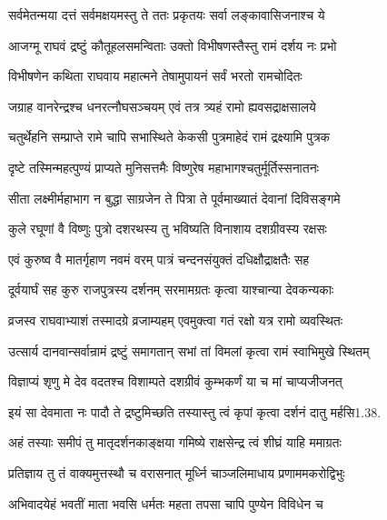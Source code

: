 \twolineshloka
{सर्वमेतन्मया दत्तं सर्वमक्षयमस्तु ते}
{ततः प्रकृतयः सर्वा लङ्कावासिजनाश्च ये}%

\twolineshloka
{आजग्मू राघवं द्रष्टुं कौतूहलसमन्विताः}
{उक्तो विभीषणस्तैस्तु रामं दर्शय नः प्रभो}%

\twolineshloka
{विभीषणेन कथिता राघवाय महात्मने}
{तेषामुपायनं सर्वं भरतो रामचोदितः}%

\twolineshloka
{जग्राह वानरेन्द्रश्च धनरत्नौघसञ्चयम्}
{एवं तत्र त्र्यहं रामो ह्यवसद्राक्षसालये}%

\twolineshloka
{चतुर्थेहनि सम्प्राप्ते रामे चापि सभास्थिते}
{केकसी पुत्रमाहेदं रामं द्रक्ष्यामि पुत्रक}%

\twolineshloka
{दृष्टे तस्मिन्महत्पुण्यं प्राप्यते मुनिसत्तमैः}
{विष्णुरेष महाभागश्चतुर्मूर्तिस्सनातनः}%

\twolineshloka
{सीता लक्ष्मीर्महाभाग न बुद्धा साग्रजेन ते}
{पित्रा ते पूर्वमाख्यातं देवानां दिविसङ्गमे}%

\twolineshloka
{कुले रघूणां वै विष्णुः पुत्रो दशरथस्य तु}
{भविष्यति विनाशाय दशग्रीवस्य रक्षसः}%


\twolineshloka
{एवं कुरुष्व वै मातर्गृहाण नवमं वरम्}
{पात्रं चन्दनसंयुक्तं दधिक्षौद्राक्षतैः सह}%

\twolineshloka
{दूर्वयार्घं सह कुरु राजपुत्रस्य दर्शनम्}
{सरमामग्रतः कृत्वा याश्चान्या देवकन्यकाः}%

\twolineshloka
{व्रजस्व राघवाभ्याशं तस्मादग्रे व्रजाम्यहम्}
{एवमुक्त्वा गतं रक्षो यत्र रामो व्यवस्थितः}%

\twolineshloka
{उत्सार्य दानवान्सर्वान्रामं द्रष्टुं समागतान्}
{सभां तां विमलां कृत्वा रामं स्वाभिमुखे स्थितम्}%


\twolineshloka
{विज्ञाप्यं शृणु मे देव वदतश्च विशाम्पते}
{दशग्रीवं कुम्भकर्णं या च मां चाप्यजीजनत्}%

\twolineshloka
{इयं सा देवमाता नः पादौ ते द्रष्टुमिच्छति}
{तस्यास्तु त्वं कृपां कृत्वा दर्शनं दातु मर्हसि1.38.}%


\twolineshloka
{अहं तस्याः समीपं तु मातृदर्शनकाङ्क्षया}
{गमिष्ये राक्षसेन्द्र त्वं शीघ्रं याहि ममाग्रतः}%

\twolineshloka
{प्रतिज्ञाय तु तं वाक्यमुत्तस्थौ च वरासनात्}
{मूर्ध्नि चाञ्जलिमाधाय प्रणाममकरोद्विभुः}%

\twolineshloka
{अभिवादयेहं भवतीं माता भवसि धर्मतः}
{महता तपसा चापि पुण्येन विविधेन च}%

